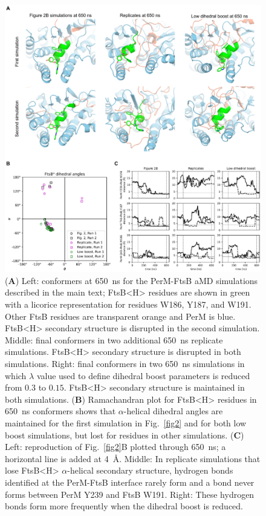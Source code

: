 \documentclass[pdflatex,sn-nature]{sn-jnl}%
\def\textsuperscript#1{<#1>}%
\newcommand\ftsbH{FtsB\textsuperscript{H}}
\begin{document}
\begin{appendices}
\begin{figure}[htb]
    \centering
    \includegraphics[width=1.0\textwidth]{./figS2.eps}
    \caption{
        (\textbf{A}) Left: conformers at \qty{650}{\ns} for the PerM-FtsB aMD simulations described in the main text; \ftsbH{} residues are shown in green with a licorice representation for residues W186, Y187, and W191. Other FtsB residues are transparent orange and PerM is blue. \ftsbH{} secondary structure is disrupted in the second simulation. Middle: final conformers in two additional \qty{650}{\ns} replicate simulations. \ftsbH{} secondary structure is disrupted in both simulations. Right: final conformers in two \qty{650}{\ns} simulations in which $\lambda$ value used to define dihedral boost parameters is reduced from $0.3$ to $0.15$. \ftsbH{} secondary structure is maintained in both simulations.
        (\textbf{B}) Ramachandran plot for \ftsbH{} residues in \qty{650}{\ns} conformers shows that $\alpha$-helical dihedral angles are maintained for the first simulation in Fig.~\ref{fig2} and for both low boost simulations, but lost for residues in other simulations.
        (\textbf{C}) Left: reproduction of Fig.~\ref{fig2}B plotted through \qty{650}{\ns}; a horizontal line is added at \qty{4}{\angstrom}. Middle: In replicate simulations that lose \ftsbH{} $\alpha$-helical secondary structure, hydrogen bonds identified at the PerM-FtsB interface rarely form and a bond never forms between PerM Y239 and FtsB W191. Right: These hydrogen bonds form more frequently when the dihedral boost is reduced.
    }\label{figS2}
    \end{figure}


\end{appendices}
\end{document}
